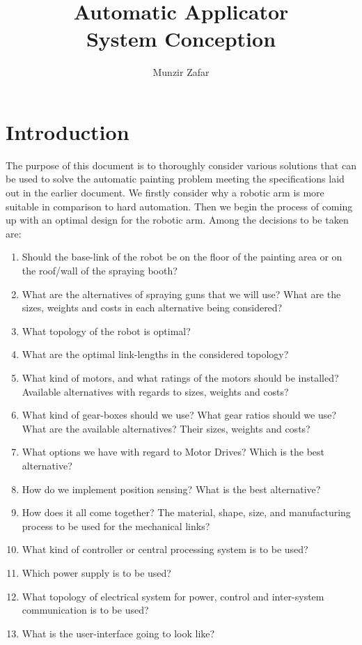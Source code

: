 \documentclass[a4paper,10pt]{article}
\title{Automatic Applicator\\System Conception}
\author{Munzir Zafar}
\begin{document}
\maketitle

\section{Introduction}

The purpose of this document is to thoroughly consider various solutions that can be used to solve the 
automatic painting problem meeting the specifications laid out in the earlier document. We firstly consider
why a robotic arm is more suitable in comparison to hard automation. Then we begin the process of 
coming up with an optimal design for the robotic arm. Among the decisions to be taken are:
\begin{enumerate}
 \item Should the base-link of the robot be on the floor of the painting area or on the roof/wall of the spraying booth?
 \item What are the alternatives of spraying guns that we will use? What are the sizes, weights and costs in each alternative being considered?
 \item What topology of the robot is optimal? 
 \item What are the optimal link-lengths in the considered topology?
 \item What kind of motors, and what ratings of the motors should be installed? Available alternatives with regards to sizes, weights and costs?
 \item What kind of gear-boxes should we use? What gear ratios should we use? What are the available alternatives? Their sizes, weights and costs?
 \item What options we have with regard to Motor Drives? Which is the best alternative?
 \item How do we implement position sensing? What is the best alternative?
 \item How does it all come together? The material, shape, size, and manufacturing process to be used for the mechanical links?
 \item What kind of controller or central processing system is to be used?
 \item Which power supply is to be used?
 \item What topology of electrical system for power, control and inter-system communication is to be used? 
 \item What is the user-interface going to look like?
\end{enumerate}
\end{document}
